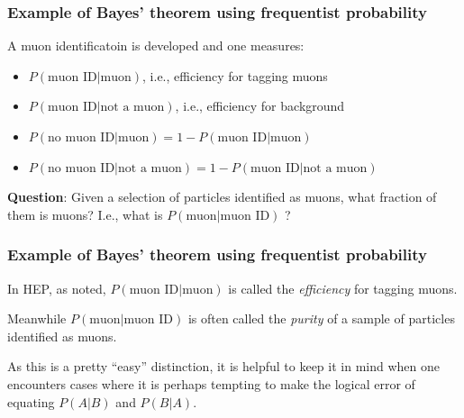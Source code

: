 \documentclass[9pt]{beamer}
\newif\ifmynote
\newcommand\mynote[1]{%
\ifmynote \textbf{#1} \else \fi
}
\begin{document}
\begin{frame}
 \frametitle{Example of Bayes' theorem using frequentist probability}
 
 \mynote{Écrire au tableau}
 
 A muon identificatoin is developed and one measures:
 
 \begin{itemize}
  \item $P(\text{muon ID} | \text{muon})$, i.e., efficiency for tagging muons
  \item $P(\text{muon ID} | \text{not a muon})$, i.e., efficiency for background
  \item $P(\text{no muon ID} | \text{muon}) = 1 - P(\text{muon ID} | \text{muon})$
  \item $P(\text{no muon ID} | \text{not a muon}) = 1 - P(\text{muon ID} | \text{not a muon})$
 \end{itemize}
 
 \vspace{10pt}
 
\textbf{Question}: Given a selection of particles identified as muons, what
fraction of them is muons? I.e., what is $P(\text{muon} | \text{muon ID})$ ?

\vspace{10pt}


\end{frame}
\begin{frame}
 \frametitle{Example of Bayes' theorem using frequentist probability}
 
 \mynote{Écrire au tableau}
 
 In HEP, as noted, $P(\text{muon ID} | \text{muon})$ is called the \emph{efficiency} for tagging muons.
 
 Meanwhile $P(\text{muon} | \text{muon ID})$ is often called the \emph{purity} of a sample of particles identified as muons.
 
As this is a pretty ``easy'' distinction, it is helpful to keep it in mind when one encounters cases where it is perhaps tempting to make the logical error of equating $P(A|B)$ and $P(B|A)$.

\end{frame}
\end{document}
